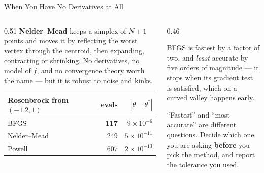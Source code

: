 \begin{frame}{When You Have No Derivatives at All}
\begin{columns}[T]
\begin{column}{0.51\textwidth}
\small
\textbf{Nelder--Mead} keeps a simplex of $N+1$ points and moves it by reflecting the worst vertex through the centroid, then expanding, contracting or shrinking. No derivatives, no model of $f$, and no convergence theory worth the name --- but it is robust to noise and kinks.
\medskip
\begin{center}\footnotesize
\begin{tabularx}{\linewidth}{@{}>{\raggedright\arraybackslash}X r r@{}}
\toprule
Rosenbrock from $(-1.2,1)$ & \textbf{evals} & \textbf{$|\theta-\theta^*|$} \\
\midrule
BFGS & \textbf{117} & $9\times10^{-6}$ \\
Nelder--Mead & 249 & $5\times10^{-11}$ \\
Powell & 607 & $2\times10^{-13}$ \\
\bottomrule
\end{tabularx}
\end{center}
\end{column}
\begin{column}{0.46\textwidth}
\begin{takeawaybox}[title=\textbf{Read that carefully}]\small
BFGS is fastest by a factor of two, and \emph{least} accurate by five orders of magnitude --- it stops when its gradient test is satisfied, which on a curved valley happens early.
\end{takeawaybox}
\medskip
\begin{examplebox}\footnotesize
``Fastest'' and ``most accurate'' are different questions. Decide which one you are asking \textbf{before} you pick the method, and report the tolerance you used.
\end{examplebox}
\end{column}
\end{columns}
\end{frame}

